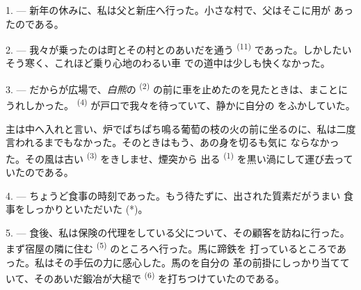 %


\VUsaut{4.0mm}
\VUsaut{3.0mm}
\VUfilet{16mm}
\VUsaut{5.6mm}
\VUsaut{3.0mm}

\VUsaut{3.0mm}

\VUsaut{4.0mm}

1. --- 新年の休みに、私は父と新庄へ行った。小さな村で、父はそこに用が
あったのである。

2. --- 我々が乗ったのは町とその村とのあいだを通う
\textsuperscript{(11)} であった。しかしたいそう寒く、これほど乗り心地のわるい車
での道中は少しも快くなかった。

3. --- だからが広場で、\textit{白熊}の
\textsuperscript{(2)} の前に車を止めたのを見たときは、まことにうれしかった。
 \textsuperscript{(4)} が戸口で我々を待っていて、静かに自分の
をふかしていた。

主は中へ入れと言い、炉でぱちぱち鳴る葡萄の枝の火の前に坐るのに、私は二度
言われるまでもなかった。そのときはもう、あの身を切るも気に
ならなかった。その風は古い \textsuperscript{(3)} をきしませ、煙突から
出る \textsuperscript{(1)} を黒い渦にして運び去っていたのである。

4. --- ちょうど食事の時刻であった。もう待たずに、出された質素だがうまい
食事をしっかりといただいた (*)。

\VUsaut{3.0mm}

5. --- 食後、私は保険の代理をしている父について、その顧客を訪ねに行った。
まず宿屋の隣に住む \textsuperscript{(5)} のところへ行った。馬に蹄鉄を
打っているところであった。私はその手伝の力に感心した。馬のを自分の
革の前掛にしっかり当てていて、そのあいだ鍛冶が大槌で
\textsuperscript{(6)} を打ちつけていたのである。

